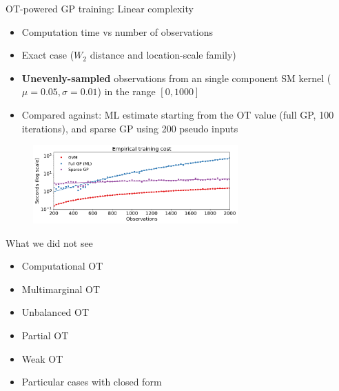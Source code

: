 \documentclass[pdf,aspectratio=169,10pt]{beamer}
\begin{document}
\begin{frame}[plain]{OT-powered GP training: Linear complexity }

\begin{itemize}
    \item Computation time vs number of observations
    \item Exact case ($W_2$ distance and location-scale family)
    \item \textbf{Unevenly-sampled} observations from an single component SM kernel ($\mu=0.05, \sigma=0.01$) in the range $[0,1000]$
    \item Compared against: ML estimate starting from the OT value (full GP, 100 iterations), and sparse GP using 200 pseudo inputs
\end{itemize}

\begin{figure}[ht]
\centering
  \includegraphics[width=0.7\textwidth]{../img/exp2.pdf}
  \label{fig:comp_cost}
\end{figure} 
    
\end{frame}







\begin{frame}{What we did not see}
\begin{itemize}
    \item Computational OT
    \item Multimarginal OT
    \item Unbalanced OT
    \item Partial OT
    \item Weak OT
    \item Particular cases with closed form
\end{itemize}
\end{frame}
\end{document}
